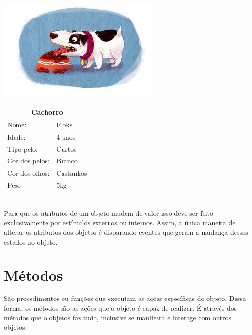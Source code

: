   \begin{minipage}{\textwidth}
    \begin{minipage}[b]{0.49\textwidth}
      \centering
      \includegraphics[scale=0.6]{imagens/cachorro-objeto-2.png}
      \label{fig:cachorro-objeto-2}
    \end{minipage}
    \hfill
    \begin{minipage}[b]{0.49\textwidth}
      \centering
      \begin{tabular}{|l|l|}
        \hline
        \multicolumn{2}{|c|}{Cachorro}      \\ \hline
          Nome:                 & Floks     \\ \hline
          Idade:                & 4 anos    \\ \hline
          Tipo pelo:            & Curtos    \\ \hline
          Cor dos pelos:        & Branco    \\ \hline
          Cor dos olhos:        & Castanhos \\ \hline
          Peso                  & 5kg       \\ \hline
        \end{tabular}
      \end{minipage}
    \end{minipage} \\ 

    Para que os atributos de um objeto mudem de valor isso deve ser feito 
    exclusivamente por estímulos externos ou internos. Assim, a única maneira 
    de alterar os atributos dos objetos é disparando eventos que geram a 
    mudança desses estados no objeto.

\section{Métodos}

São procedimentos ou funções que executam as ações específicas do objeto. 
Dessa forma, os métodos são as ações que o objeto é capaz de realizar. É 
através dos métodos que o objetos faz tudo, inclusive se manifesta e 
interage com outros objetos.


